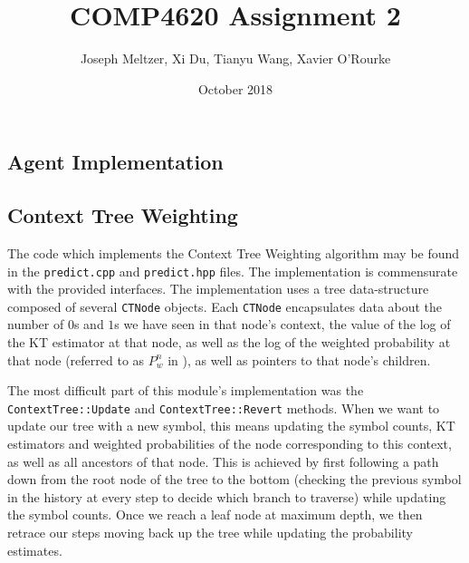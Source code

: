 \documentclass{article}
\title{COMP4620 Assignment 2}
\author{Joseph Meltzer, Xi Du, Tianyu Wang, Xavier O'Rourke}
\date{October 2018}
\let\Oldsection\section
\renewcommand{\section}{\FloatBarrier\Oldsection}
\let\Oldsubsection\subsection
\renewcommand{\subsection}{\FloatBarrier\Oldsubsection}
\begin{document}
\maketitle
\begin{flushleft}



\section{Agent Implementation}

\subsection{Context Tree Weighting}



The code which implements the Context Tree Weighting algorithm may be found in the \texttt{predict.cpp} and \texttt{predict.hpp} files. The implementation is commensurate with the provided interfaces. The implementation uses a tree data-structure composed of several \texttt{CTNode} objects. Each \texttt{CTNode} encapsulates data about the number of $0$s and $1$s we have seen in that node's context, the value of the log of the KT estimator at that node, as well as the log of the weighted probability at that node (referred to as $P^n _w$ in \cite{orig}), as well as pointers to that node's children. \newline

The most difficult part of this module's implementation was the \texttt{ContextTree::Update} and \texttt{ContextTree::Revert} methods. When we want to update our tree with a new symbol, this means updating the symbol counts, KT estimators and weighted probabilities of the node corresponding to this context, as well as all ancestors of that node. This is achieved by first following a path down from the root node of the tree to the bottom (checking the previous symbol in the history at every step to decide which branch to traverse) while updating the symbol counts. Once we reach a leaf node at maximum depth, we then retrace our steps moving back up the tree while updating the probability estimates. \newline


\end{flushleft}
\end{document}
